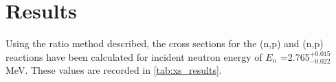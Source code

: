 \documentclass[5p]{elsarticle}
\newcommand{\comment}[1]{\todo[color=blue!20!white,inline]{ASV: #1}}
\begin{document}
\section{Results}


Using the ratio method described, the cross sections for the (n,p) and (n,p) reactions have been calculated for incident neutron energy of $E_n$ =2.765$^{+0.015}_{-0.022}$ MeV.
These values are recorded in \autoref{tab:xs_results}.




% 
\end{document}
